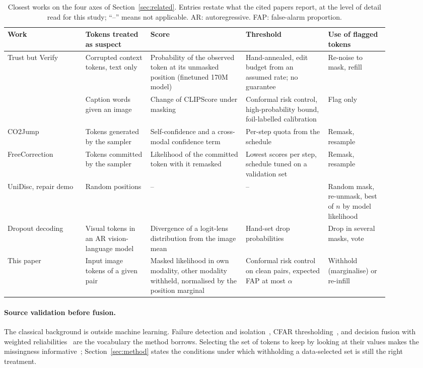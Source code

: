 \begin{table}[t]
\centering
\caption{Closest works on the four axes of Section~\ref{sec:related}. Entries restate what the cited papers report, at the
level of detail read for this study; ``--'' means not applicable. AR: autoregressive. FAP: false-alarm proportion.}
\label{tab:related}
\footnotesize
\setlength{\tabcolsep}{3pt}
\begin{tabular}{p{0.18\linewidth}p{0.15\linewidth}p{0.22\linewidth}p{0.19\linewidth}p{0.14\linewidth}}
\toprule
Work & Tokens treated as suspect & Score & Threshold & Use of flagged tokens \\
\midrule
Trust but Verify \citep{jhingran2026trustverify} & Corrupted context tokens, text only & Probability of the observed token at its unmasked position (finetuned 170M model) & Hand-annealed, edit budget from an assumed rate; no guarantee & Re-noise to mask, refill \\
\citet{gomes2025crc} & Caption words given an image & Change of CLIPScore under masking & Conformal risk control, high-probability bound, foil-labelled calibration & Flag only \\
CO2Jump \citep{le2026co2jump} & Tokens generated by the sampler & Self-confidence and a cross-modal confidence term & Per-step quota from the schedule & Remask, resample \\
FreeCorrection \citep{ouyang2026freecorrection} & Tokens committed by the sampler & Likelihood of the committed token with it remasked & Lowest scores per step, schedule tuned on a validation set & Remask, resample \\
UniDisc, repair demo~\citep{swerdlow2025unidisc} & Random positions & -- & -- & Random mask, re-unmask, best of $n$ by model likelihood \\
Dropout decoding~\citep{fang2025dropout} & Visual tokens in an AR vision-language model & Divergence of a logit-lens distribution from the image mean & Hand-set drop probabilities & Drop in several masks, vote \\
\midrule
This paper & Input image tokens of a given pair & Masked likelihood in own modality, other modality withheld, normalised by the position marginal & Conformal risk control on clean pairs, expected FAP at most $\alpha$ & Withhold (marginalise) or re-infill \\
\bottomrule
\end{tabular}
\end{table}

\paragraph{Source validation before fusion.}
The classical background is outside machine learning.
Failure detection and isolation~\citep{willsky1976survey,gao2015survey}, CFAR thresholding~\citep{finn1968adaptive,rohling1983cfar,diao2024radar},
and decision fusion with weighted reliabilities~\citep{chair1986optimal,kittler1998combining} are the vocabulary the method
borrows.
Selecting the set of tokens to keep by looking at their values makes the missingness informative~\citep{rubin1976inference};
Section~\ref{sec:method} states the conditions under which withholding a data-selected set is still the right treatment.

